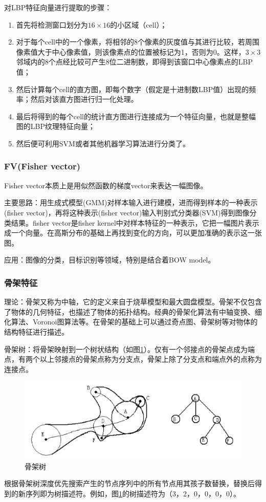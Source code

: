 \documentclass[12pt]{article}
\begin{document}
对LBP特征向量进行提取的步骤：
\begin{enumerate}
    \item 首先将检测窗口划分为$16\times16$的小区域（cell）；
    \item 对于每个cell中的一个像素，将相邻的8个像素的灰度值与其进行比较，若周围像素值大于中心像素值，则该像素点的位置被标记为1，否则为0。这样，$3\times3$邻域内的8个点经比较可产生8位二进制数，即得到该窗口中心像素点的LBP值；
    \item 然后计算每个cell的直方图，即每个数字（假定是十进制数LBP值）出现的频率；然后对该直方图进行归一化处理。
    \item 最后将得到的每个cell的统计直方图进行连接成为一个特征向量，也就是整幅图的LBP纹理特征向量；
    \item 然后便可利用SVM或者其他机器学习算法进行分类了。
\end{enumerate}

\subsubsection{FV(Fisher vector)}
   
Fisher vector本质上是用似然函数的梯度vector来表达一幅图像。

{\color{blue}主要思路}：用生成式模型(GMM)对样本输入进行建模，进而得到样本的一种表示(fisher vector)，再将这种表示(fisher vector)输入判别式分类器(SVM)得到图像分类结果。fisher vector是fisher kernel中对样本特征的一种表示，它把一幅图片表示成一个向量。在高斯分布的基础上再找到变化的方向，可以更加准确的表示这一张图。

{\color{blue}应用}：图像的分类，目标识别等领域，特别是结合着BOW model。

\subsubsection{骨架特征}

理论：骨架又称为中轴，它的定义来自于烧草模型和最大圆盘模型。骨架不仅包含了物体的几何特征，也描述了物体的拓扑结构。经典的骨架化算法有中轴变换、细化算法、Voronoi图算法等。在骨架的基础上可以通过奇点图、骨架树等对物体的结构特征进行描述。

骨架树：将骨架映射到一个树状结构（如图\ref{fig:tree}）。仅有一个邻接点的骨架点成为端点，有两个以上邻接点的骨架点称为分支点，骨架上除了分支点和端点外的点称为连接点。
        \begin{figure}
            \centering
            \includegraphics[width=0.5\linewidth]{tree}
            \caption{骨架树}
            \label{fig:tree}
        \end{figure}
        根据骨架树深度优先搜索产生的节点序列中的所有节点用其孩子数替换，替换后得到的新序列即为树描述符。例如，图\ref{fig:tree}的树描述符为（3，2，0，0，0，0）。
\end{document}
